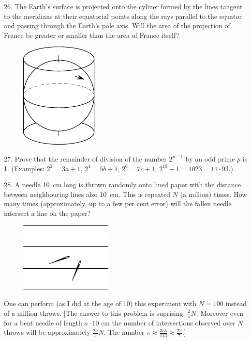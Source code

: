 \begin{problem}{26.}
	The Earth's surface is projected onto the cyliner formed by the lines tangent to the meridians
	at their equatorial points along the rays parallel to the equator and passing through the Earth's pole axis.
	Will the area of the projection of France be greater or smaller than the area of France itself?
	\begin{figure}
		\includegraphics{taskbook-10}
	\end{figure}
\end{problem}

\begin{problem}{27.}
	Prove that the remainder of division of the number $2^{p-1}$ by an odd prime $p$ is 1.
	(Examples: $2^2 = 3a +1$, $2^4 = 5b+1$, $2^6 = 7c+1$, $2^{10} - 1 = 1023 = 11\cdot 93$.)  
\end{problem}

\begin{problem}{28.}
	A needle \SI{10}{\cm} long is thrown randomly onto lined paper with the distance between neighbouring
	lines also \SI{10}{\cm}. This is repeated
	$N$ (a million) times. 
	How many times (approximately, up to a few per
	cent error) will the fallen needle intersect a line on the paper?
	\begin{figure}
		\includegraphics[scale=1]{taskbook-12}
	\end{figure}
	One can perform (as I did at the age of 10) this experiment with $N=100$ instead of a million throws.
	[The answer to this problem is suprising: $\frac2{\pi}N$. Moreover even for a bent needle of length $a \cdot 10$
	cm the number of intersections observed over $N$ throws will be approximately $\frac{2a}{\pi}N$. 
	The number $\pi \approx  \frac{355}{113} \approx \frac{22}7.$]
\end{problem}

